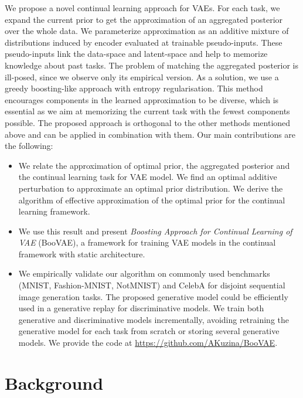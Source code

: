 We propose a novel continual learning approach for VAEs. For each task, we expand the current prior to get the approximation of an aggregated posterior over the whole data. We parameterize approximation as an additive mixture of distributions induced by encoder evaluated at trainable pseudo-inputs. These pseudo-inputs link the data-space and latent-space and help to memorize knowledge about past tasks. The problem of matching the aggregated posterior is ill-posed, since we observe only its empirical version. As a solution, we use a greedy boosting-like approach with entropy regularisation. This method encourages components in the learned approximation to be diverse, which is essential as we aim at memorizing the current task with the fewest components possible. The proposed approach is orthogonal to the other methods mentioned above and can be applied in combination with them.
Our main contributions are the following:
\begin{itemize}
    \item We relate the approximation of optimal prior, the aggregated posterior and the continual learning task for VAE model. We find an optimal additive perturbation to approximate an optimal prior distribution. We derive the algorithm of effective approximation of the optimal prior for the continual learning framework.
    \item We use this result and present \textit{Boosting Approach for Continual Learning of VAE} (BooVAE), a framework for training VAE models in the continual framework with static architecture.
    \item We empirically validate our algorithm on commonly used benchmarks (MNIST, Fashion-MNIST, NotMNIST) and CelebA for disjoint sequential image generation tasks. 
    The proposed generative model could be efficiently used in a generative replay for discriminative models. 
    We train both generative and discriminative models incrementally, avoiding retraining the generative model for each task from scratch or storing several generative models. 
    We provide the code at \url{https://github.com/AKuzina/BooVAE}.
\end{itemize}
\section{Background}
\label{background}

